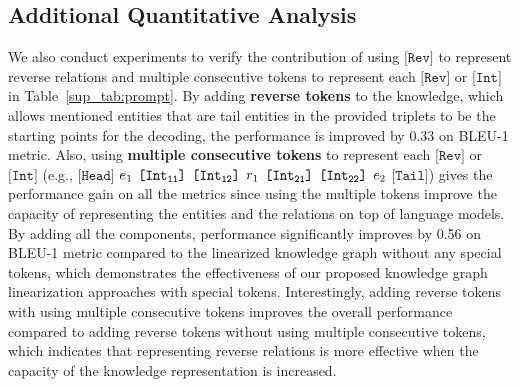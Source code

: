 \subsection{Additional Quantitative Analysis}
\label{sup_sec:aqa}
We also conduct experiments to verify the contribution of using $\texttt{[Rev]}$ to represent reverse relations and multiple consecutive tokens to represent each $\texttt{[Rev]}$ or $\texttt{[Int]}$ in Table~\ref{sup_tab:prompt}.
By adding \textbf{reverse tokens} to the knowledge, which allows mentioned entities that are tail entities in the provided triplets to be the starting points for the decoding, the performance is improved by 0.33 on BLEU-1 metric. 
Also, using \textbf{multiple consecutive tokens} to represent each $\texttt{[Rev]}$ or $\texttt{[Int]}$ (e.g., $\texttt{[Head]}$ $e_1$ $\texttt{[Int{\textsubscript{\texttt{11}}}]}$ $\texttt{[Int{\textsubscript{\texttt{12}}}]}$ $r_1$ $\texttt{[Int{\textsubscript{\texttt{21}}}]}$ $\texttt{[Int{\textsubscript{\texttt{22}}}]}$ $e_{2}$ $\texttt{[Tail]}$) gives the performance gain on all the metrics since using the multiple tokens improve the capacity of representing the entities and the relations on top of language models.
By adding all the components, performance significantly improves by 0.56 on BLEU-1 metric compared to the linearized knowledge graph without any special tokens, which demonstrates the effectiveness of our proposed knowledge graph linearization approaches with special tokens. 
Interestingly, adding reverse tokens with using multiple consecutive tokens improves the overall performance compared to adding reverse tokens without using multiple consecutive tokens, which indicates that representing reverse relations is more effective when the capacity of the knowledge representation is increased. 
